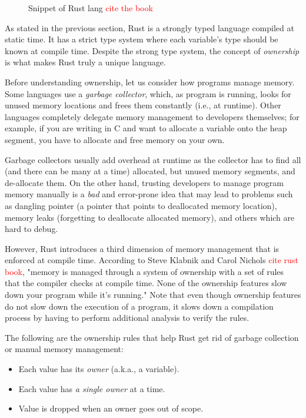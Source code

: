 \begin{figure*}[ht]
    \begin{center}
    
    \end{center}
    \caption{Snippet of Rust lang \textcolor{red}{cite the book}}
    \label{rustex1}
\end{figure*}

As stated in the previous section, Rust is a strongly typed language compiled at static time.
It has a strict type system where each variable's type should be known at compile
time. Despite the strong type system, the concept of \textit{ownership} is what
makes Rust truly a unique language.

Before understanding ownership, let us consider how programs manage memory.
Some languages use a \textit{garbage collector}, which, as program is running,
looks for unused memory locations and frees them constantly (i.e., at
runtime). Other languages completely delegate memory management to developers
themselves; for example, if you are writing in C and want to allocate a variable onto
the heap segment, you have to allocate and free memory on your own.

Garbage collectors usually add overhead at runtime as the collector has to find
all (and there can be many at a time) allocated, but unused memory segments,
and de-allocate them. On the other hand, trusting developers to manage program
memory manually is a \textit{bad} and error-prone idea that may lead to problems such
as dangling pointer (a pointer that points to deallocated memory
location), memory leaks (forgetting to deallocate allocated memory), and others which
are hard to debug.

However, Rust introduces a third dimension of memory management
that is enforced at compile time. According to Steve Klabnik and Carol Nichols
\textcolor{red}{cite rust book}, "memory is managed through a system of
ownership with a set of rules that the compiler checks at compile time. None of
the ownership features slow down your program while it's running." Note
that even though ownership features do not slow down the execution of a program,
it slows down a compilation process by having to perform additional analysis
to verify the rules.

The following are the ownership rules that help Rust get rid of garbage collection
or manual memory management:

\begin{itemize}
    \item Each value has its \textit{owner} (a.k.a., a variable).
    \item Each value has \textit{a single owner} at a time.
    \item Value is dropped when an owner goes out of scope.
\end{itemize}

